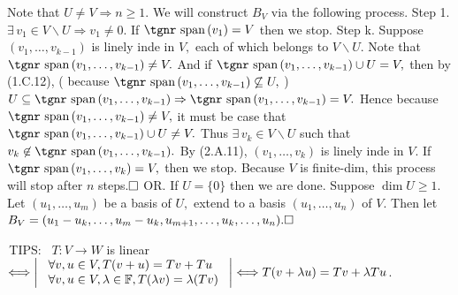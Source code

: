\documentclass[a4paper, 11pt, UTF8]{article}
\newcommand{\Largebfx}[1]{{\Large\tgbfx#1}}
\def\Spn{{\textup{\tgnr span}}\,}
\def\Fbb{{\mathbb{F}}}
\def\BulletPoint{{\small\bullet}}
\def\Or{{\large O{\footnotesize R.} }}
\def\Tips{{\tgbfx\large T{\footnotesize IPS:}}}
\def\ChEnd{\rightline{\Largebfx{E{\small NDED}}}\par\vspace{6pt}}
\begin{document}
\begin{large}
\TextB{\vspace{0pt}}
Note that $U\neq V\Rightarrow n\geq 1.$ We will construct $B_V$ via the following process.\TextB{}
{\tgbfx Step 1.} $\exists\,v_1\in V\backslash U\Rightarrow v_1\neq 0.$ If $\Spn(v_1)=V$ then we stop.\TextB{}
{\tgbfx Step k.} Suppose $(v_1,\dots,v_{k-1})$ is linely inde in $V,$ each of which belongs to $V\backslash U.$\TextB{}
Note that $\Spn(v_1,\dots,v_{k-1})\neq V.$ And if $\Spn(v_1,\dots,v_{k-1})\cup U=V,$ then by (1.C.12),\TextB{}
( because $\Spn(v_1,\dots,v_{k-1})\not\subseteq U,$ ) $U\subseteq \Spn(v_1,\dots,v_{k-1})\Rightarrow\Spn(v_1,\dots,v_{k-1})=V.$\TextB{}
Hence because $\Spn(v_1,\dots,v_{k-1})\neq V,$ it must be case that $\Spn(v_1,\dots,v_{k-1})\cup U\neq V.$\TextB{}
Thus $\exists\,v_k\in V\backslash U$ such that $v_k\not\in\Spn(v_1,\dots,v_{k-1}).$\TextB{}
By (2.A.11), $(v_1,\dots,v_k)$ is linely inde in $V$. If $\Spn(v_1,\dots,v_k)=V,$ then we stop.\TextB{}
Because $V$ is finite-dim, this process will stop after $n$ steps.$\hfill\square$\vspace{8pt}\TextB{}
\Or If $U=\{0\}$ then we are done. Suppose $\dim U\geq 1.$\TextB{}
Let $(u_1,\dots,u_m)$ be a basis of $U,$ extend to a basis $(u_1,\dots,u_n)$ of $V.$\TextB{}
Then let $B_V=(u_1-u_k,\dots,u_m-u_k,u_{m+1},\dots,u_k,\dots,u_n).\hfill\square$\par
\SepLine\par
\ChEnd

\pagebreak


\vspace{12pt}

\BulletPoint \hspace{1pt}\,\Tips\,\,\, {\tgsl$T:V\rightarrow W$ is linear $\Longleftrightarrow\MathLeftrightMid{l}{$
$\forall v,u\in V,T(v+u)=Tv+Tu\\ $
$\forall v,u\in V,\lambda\in\Fbb,T(\lambda v)=\lambda(Tv)$
$}\Longleftrightarrow T(v+\lambda u)=Tv+\lambda Tu$.}\par\vspace{6pt}
\SepLine\par


\end{large}
\end{document}
